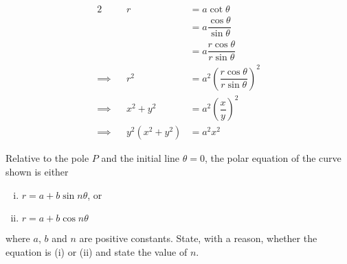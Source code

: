 \documentclass{jhwhw}
\begin{document}
            \begin{alignat*}{2}
                &&r &= a\cot\theta\\
                && &= a\dfrac{\cos\theta}{\sin\theta}\\
                && &= a\dfrac{r\cos\theta}{r\sin\theta}\\
                \implies&&r^2 &= a^2\left(\dfrac{r\cos\theta}{r\sin\theta}\right)^2\\
                \implies&&x^2 + y^2 &= a^2\left(\dfrac{x}{y}\right)^2\\
                \implies&&y^2(x^2 + y^2) &= a^2x^2
            \end{alignat*}


    \problem{}
        \begin{center}
        \end{center}
        \noindent Relative to the pole $P$ and the initial line $\theta = 0$, the polar equation of the curve shown is either
        
        \begin{enumerate}[i.]
            \item $r = a+b\sin n\theta$, or
            \item $r = a + b\cos n \theta$
        \end{enumerate}
        \noindent where $a$, $b$ and $n$ are positive constants. State, with a reason, whether the equation is (i) or (ii) and state the value of $n$.
\end{document}
